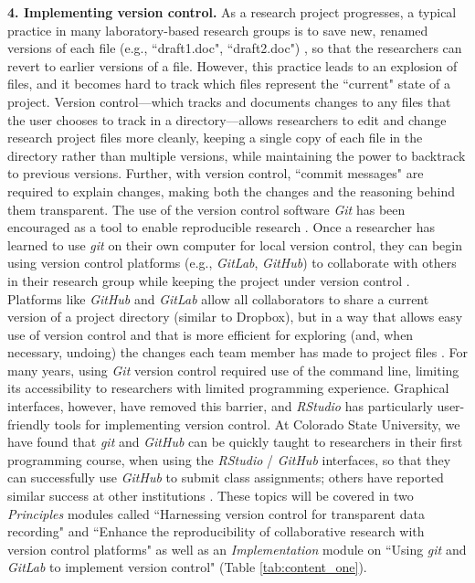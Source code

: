 \documentclass[pdftex,english,11.5pt,parskip=half]{scrartcl}
\begin{document}
\textbf{4. Implementing version control.} As a research project progresses, a typical practice in many laboratory-based research groups is to save new, renamed versions of each file (e.g., ``draft1.doc", ``draft2.doc") \cite{bryan2018excuse}, so that the researchers can revert to earlier versions of a file. However, this practice leads to an explosion of files, and it becomes hard to track which files represent the ``current" state of a project. Version control---which tracks and documents changes to any files that the user chooses to track in a directory---allows researchers to edit and change research project files more cleanly, keeping a single copy of each file in the directory rather than multiple versions, while maintaining the power to backtrack to previous versions. Further, with version control, ``commit messages" are required to explain changes, making both the changes and the reasoning behind them transparent. The use of the version control software \textit{Git} has been encouraged as a tool to enable reproducible research \cite{piccolo2016tools, ram2013git, bryan2018excuse, lowndes2017our, cetinkaya2017infrastructure}. Once a researcher has learned to use \textit{git} on their own computer for local version control, they can begin using version control 
platforms (e.g., \textit{GitLab}, \textit{GitHub}) to collaborate with others in their research
group while keeping the project under version control \cite{bryan2018excuse, shade2015computing}. Platforms like \textit{GitHub} and \textit{GitLab} allow
all collaborators to share a current version of a project directory 
(similar to Dropbox), but in a way that allows easy use of version control 
and that is more efficient for exploring (and, when necessary, undoing) the changes 
each team member has made to project files \cite{bryan2018excuse}. For many years, using \textit{Git} version control required use of the command line,
limiting its accessibility to researchers with limited programming experience.
Graphical interfaces, however, have removed this barrier, and \textit{RStudio} has 
particularly user-friendly tools for implementing version control. At Colorado State University, we have found that \textit{git} and \textit{GitHub} can be quickly taught  to researchers in their first programming course, when using the \textit{RStudio} / \textit{GitHub} interfaces, so that they can successfully use \textit{GitHub} to submit class assignments; others have reported similar success at other institutions \cite{bryan2018excuse}. These
topics will be covered in two \textit{Principles} modules called ``Harnessing
version control for transparent data recording" and ``Enhance the
reproducibility of collaborative research with version control platforms" as
well as an \textit{Implementation} module on ``Using \textit{git} and \textit{GitLab} to implement
version control" (Table \ref*{tab:content_one}). 
\end{document}
